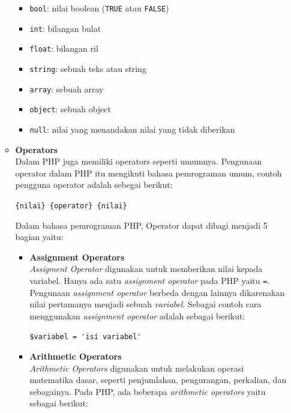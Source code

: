 \documentclass[a4paper,twoside]{article}
\begin{document}
\begin{enumerate}
\begin{itemize}
		            \begin{itemize}
			            \item \verb|bool|: nilai boolean (\verb|TRUE| atau \verb|FALSE|)
			            \item \verb|int|: bilangan bulat
			            \item \verb|float|: bilangan ril
			            \item \verb|string|: sebuah teks atau string
			            \item \verb|array|: sebuah array
			            \item \verb|object|: sebuah object
			            \item \verb|null|: nilai yang menandakan nilai yang tidak diberikan
		            \end{itemize}

		      \item \textbf{Operators} \\
		            Dalam PHP juga memiliki operators seperti umumnya. Pengunaan operator dalam PHP itu mengikuti bahasa pemrograman umum, contoh pengguna operator adalah sebegai berikut:

		            \begin{center}
			            \verb|{nilai} {operator} {nilai}|
		            \end{center}

		            Dalam bahasa pemrograman PHP, Operator dapat dibagi menjadi 5 bagian yaitu:

		            \begin{itemize}
			            \item \textbf{Assignment Operators} \\
			                  \textit{Assigment Operator} digunakan untuk memberikan nilai kepada variabel. Hanya ada satu \textit{assignment operator} pada PHP yaitu \verb|=|. Pengunaan \textit{assignment operator} berbeda dengan lainnya dikarenakan nilai pertamanya menjadi sebuah \textit{variabel}. Sebagai contoh cara menggunakan \textit{assignment operator} adalah sebagai berikut:

			                  \begin{center}
				                  \verb|$variabel = 'isi variabel'|
			                  \end{center}

			            \item \textbf{Arithmetic Operators} \\
			                  \textit{Arithmetic Operators} digunakan untuk melakukan operasi matematika dasar, seperti penjumlahan, pengurangan, perkalian, dan sebagainya. Pada PHP, ada beberapa \textit{arithmetic operators} yaitu sebagai berikut:


\end{itemize}
\end{itemize}
\end{enumerate}
\end{document}

